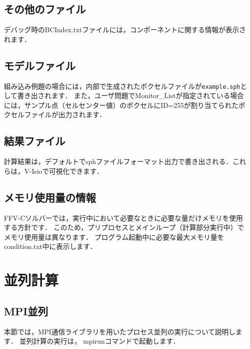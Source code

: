 %
\pagebreak
\subsection{その他のファイル}
デバッグ時のBCIndex.txtファイルには，コンポーネントに関する情報が表示されます．

%
\pagebreak
\subsection{モデルファイル}
組み込み例題の場合には，内部で生成されたボクセルファイルが\verb|example.sph|として書き出されます．
また，ユーザ問題でMonitor\_Listが指定されている場合には，サンプル点（セルセンター値）のボクセルにID=255が割り当てられたボクセルファイルが出力されます．

%
\pagebreak
\subsection{結果ファイル}

計算結果は，デフォルトでsphファイルフォーマット出力で書き出される．これらは，V-Isioで可視化できます．


%
\pagebreak
\subsection{メモリ使用量の情報}

FFV-Cソルバーでは，実行中において必要なときに必要な量だけメモリを使用する方針です．
このため，プリプロセスとメインループ（計算部分実行中）でメモリ使用量は異なります．
プログラム起動中に必要な最大メモリ量をcondition.txt中に表示します．




\pagebreak
\section{並列計算}
\label{sec:parallel_exec}

\subsection{MPI並列}
\label{sec:MPI}
本節では，MPI通信ライブラリを用いたプロセス並列の実行について説明します．
並列計算の実行は，
mpirunコマンドで起動します．

{\small
{}
}

